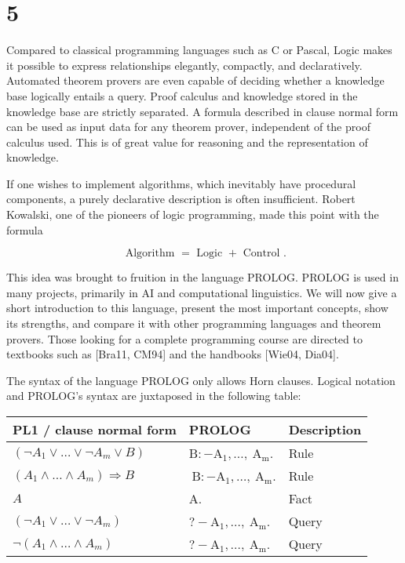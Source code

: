 \documentclass[10pt]{article}
\begin{document}
\section*{5}
Compared to classical programming languages such as C or Pascal, Logic makes it possible to express relationships elegantly, compactly, and declaratively. Automated theorem provers are even capable of deciding whether a knowledge base logically entails a query. Proof calculus and knowledge stored in the knowledge base are strictly separated. A formula described in clause normal form can be used as input data for any theorem prover, independent of the proof calculus used. This is of great value for reasoning and the representation of knowledge.

If one wishes to implement algorithms, which inevitably have procedural components, a purely declarative description is often insufficient. Robert Kowalski, one of the pioneers of logic programming, made this point with the formula

$$
\text { Algorithm }=\text { Logic }+ \text { Control } .
$$

This idea was brought to fruition in the language PROLOG. PROLOG is used in many projects, primarily in AI and computational linguistics. We will now give a short introduction to this language, present the most important concepts, show its strengths, and compare it with other programming languages and theorem provers. Those looking for a complete programming course are directed to textbooks such as [Bra11, CM94] and the handbooks [Wie04, Dia04].

The syntax of the language PROLOG only allows Horn clauses. Logical notation and PROLOG's syntax are juxtaposed in the following table:

\begin{center}
\begin{tabular}{lll}
\hline
PL1 / clause normal form & PROLOG & Description \\
\hline
$\left(\neg A_{1} \vee \ldots \vee \neg A_{m} \vee B\right)$ & $\mathrm{B}:-\mathrm{A}_{1}, \ldots, \mathrm{~A}_{\mathrm{m}}$. & Rule \\
\hline
$\left(A_{1} \wedge \ldots \wedge A_{m}\right) \Rightarrow B$ & $\mathrm{~B}:-\mathrm{A}_{1}, \ldots, \mathrm{~A}_{\mathrm{m}}$. & Rule \\
\hline
$A$ & A. & Fact \\
\hline
$\left(\neg A_{1} \vee \ldots \vee \neg A_{m}\right)$ & $?-\mathrm{A}_{1}, \ldots, \mathrm{~A}_{\mathrm{m}}$. & Query \\
\hline
$\neg\left(A_{1} \wedge \ldots \wedge A_{m}\right)$ & $?-\mathrm{A}_{1}, \ldots, \mathrm{~A}_{\mathrm{m}}$. & Query \\
\hline
\end{tabular}
\end{center}
\end{document}
